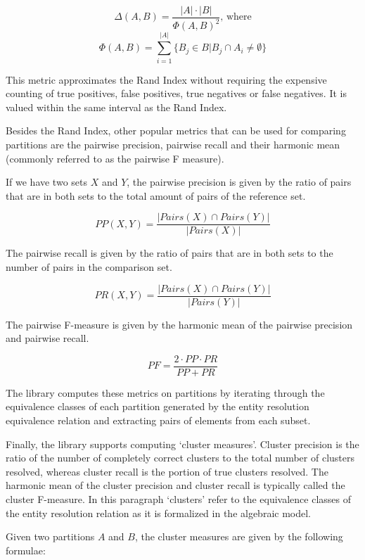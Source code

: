 \documentclass[a4paper,twoside]{article}
\begin{document}
    \[ \varDelta(A, B) = \frac{|A|\cdot|B|}{\varPhi{\left(A, B\right)}^2}\textrm{, where}\]
    \[ \varPhi(A, B) = \sum_{i=1}^{|A|}\{B_j \in B | B_j \cap A_i \neq \emptyset \} \]

    This metric approximates the Rand Index without requiring the expensive
    counting of true positives, false positives, true negatives or false
    negatives\cite{tal2007algebraic}.
    It is valued within the same interval as the Rand Index.
    
    Besides the Rand Index, other popular metrics that can be used for comparing
    partitions are the pairwise precision, pairwise recall and their harmonic
    mean (commonly referred to as the pairwise F measure)\cite{hitesh2012}.
    
    If we have two sets $X$ and $Y$, the pairwise precision is given by the
    ratio of pairs that are in both sets to the total amount of pairs of the
    reference set.

    \[ PP(X, Y) = \frac{|{Pairs(X)}\cap{Pairs(Y)}|}{|Pairs(X)|} \]
    
    The pairwise recall is given by the ratio of pairs that are in both sets
    to the number of pairs in the comparison set\cite{hitesh2012}.

    \[ PR(X, Y) = \frac{|{Pairs(X)}\cap{Pairs(Y)}|}{|Pairs(Y)|} \]

    The pairwise F-measure is given by the harmonic mean of the pairwise
    precision and pairwise recall.

    \[ PF = \frac{2 \cdot PP \cdot PR}{PP + PR} \]

    The library computes these metrics on partitions by iterating through the
    equivalence classes of each partition generated by the entity resolution
    equivalence relation and extracting pairs of elements from each subset.
    
    Finally, the library supports computing `cluster measures'\cite{hitesh2012}.
    Cluster precision is the ratio of the number of completely correct
    clusters to the total number of clusters resolved, whereas cluster recall
    is the portion of true clusters resolved\cite{huang2006efficient}.
    The harmonic mean of the cluster precision and cluster recall is typically
    called the cluster F-measure.
    In this paragraph `clusters' refer to the equivalence classes of the entity
    resolution relation as it is formalized in the algebraic model.
    
    Given two partitions $A$ and $B$, the cluster measures are given by the
    following formulae:
\end{document}
